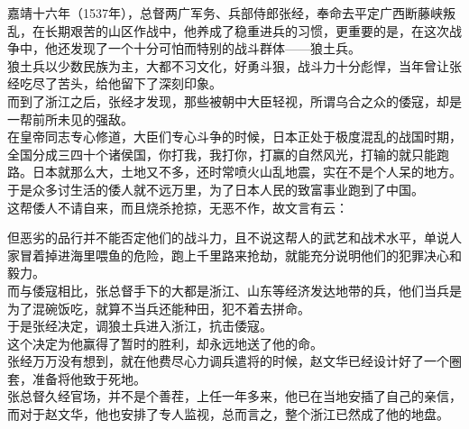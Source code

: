 \begin{multicols}{\theparacolNo}
嘉靖十六年（1537年），总督两广军务、兵部侍郎张经，奉命去平定广西断藤峡叛乱，在长期艰苦的山区作战中，他养成了稳重进兵的习惯，更重要的是，在这次战争中，他还发现了一个十分可怕而特别的战斗群体——狼土兵。\\

狼土兵以少数民族为主，大都不习文化，好勇斗狠，战斗力十分彪悍，当年曾让张经吃尽了苦头，给他留下了深刻印象。\\

而到了浙江之后，张经才发现，那些被朝中大臣轻视，所谓乌合之众的倭寇，却是一帮前所未见的强敌。\\

在皇帝同志专心修道，大臣们专心斗争的时候，日本正处于极度混乱的战国时期，全国分成三四十个诸侯国，你打我，我打你，打赢的自然风光，打输的就只能跑路。日本就那么大，土地又不多，还时常喷火山乱地震，实在不是个人呆的地方。于是众多讨生活的倭人就不远万里，为了日本人民的致富事业跑到了中国。\\

这帮倭人不请自来，而且烧杀抢掠，无恶不作，故文言有云：
\begin{quote}
	\begin{spacing}{0.5}  %
		\textit{{\footnotesize
				\begin{description}
					\item[\textcolor{Gray}{\FA }] 倭人为寇，是为倭寇。
				\end{description}
		}}
	\end{spacing}
\end{quote}

但恶劣的品行并不能否定他们的战斗力，且不说这帮人的武艺和战术水平，单说人家冒着掉进海里喂鱼的危险，跑上千里路来抢劫，就能充分说明他们的犯罪决心和毅力。\\

而与倭寇相比，张总督手下的大都是浙江、山东等经济发达地带的兵，他们当兵是为了混碗饭吃，就算不当兵还能种田，犯不着去拼命。\\

于是张经决定，调狼土兵进入浙江，抗击倭寇。\\

这个决定为他赢得了暂时的胜利，却永远地送了他的命。\\

张经万万没有想到，就在他费尽心力调兵遣将的时候，赵文华已经设计好了一个圈套，准备将他致于死地。\\

张总督久经官场，并不是个善茬，上任一年多来，他已在当地安插了自己的亲信，而对于赵文华，他也安排了专人监视，总而言之，整个浙江已然成了他的地盘。\\


\end{multicols}
